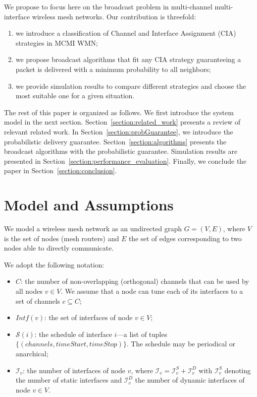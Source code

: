 \documentclass[twoside]{article}
\newcommand{\intf}{\mathcal{I}}
\newcommand{\sched}{\mathcal{S}}
\begin{document}
We propose to focus here on the broadcast problem in multi-channel multi-interface wireless mesh networks.
Our contribution is threefold:
\begin{enumerate}
	\item we introduce a classification of Channel and Interface Assignment (CIA) strategies in MCMI WMN;

	\item we propose broadcast algorithms that fit any CIA strategy guaranteeing a packet is delivered with a minimum probability to all neighbors; 
	
	\item we provide simulation results to compare different strategies and choose
the most suitable one for a given situation. 
\end{enumerate}


The rest of this paper is organized as follows.
We first introduce the system model in the next section.
Section~\ref{section:related_work} presents a review of relevant related work.
In Section~\ref{section:probGuarantee}, we introduce the probabilistic delivery guarantee.
Section~\ref{section:algorithms} presents the broadcast algorithms with the
probabilistic guarantee. 
Simulation results are presented in Section~\ref{section:performance_evaluation}.
Finally, we conclude the paper in Section~\ref{section:conclusion}.








\section{Model and Assumptions}
\label{sec:model}



We model a wireless mesh network as an undirected graph $G=(V,E)$, where $V$ is the set of nodes (mesh routers) and $E$ the set of edges corresponding to two nodes able to directly communicate. 

We adopt the following notation:
\begin{itemize}
	\item $C$: the number of non-overlapping (orthogonal) channels that can be used by all nodes $v \in V$. 
	We assume that a node can tune each of its interfaces to a set of channels $c \subseteq {C}$;

	\item $Intf(v)$: the set of interfaces of node $v \in V$;

	\item $\sched(i)$: the schedule of interface $i$---a list of tuples $\{(channels,timeStart,timeStop)\}$.
	The schedule may be periodical or anarchical;

	\item $\intf_{v}$: the number of interfaces of node $v$, where $\intf_{v}= \intf_{v}^S+\intf_{v}^D$ with $\intf_{v}^S$ denoting the number of static interfaces and $\intf_{v}^D$ the number of dynamic interfaces of node $v  \in V$.

\end{itemize}
\end{document}
